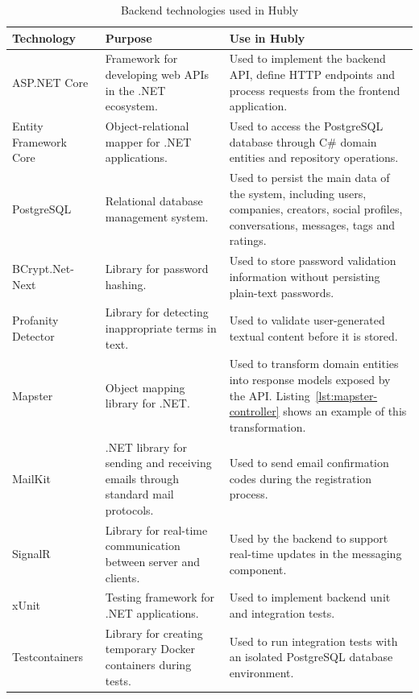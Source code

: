 \begin{table}[H]
\centering
\small
\begin{tabular}{|p{}|p{}|p{}|}
\hline
\textbf{Technology} & \textbf{Purpose} & \textbf{Use in Hubly} \\ \hline
ASP.NET Core~\cite{aspnetcore} & Framework for developing web APIs in the .NET ecosystem. & Used to implement the backend API, define HTTP endpoints and process requests from the frontend application. \\ \hline
Entity Framework Core~\cite{entityframeworkcore} & Object-relational mapper for .NET applications. & Used to access the PostgreSQL database through C\# domain entities and repository operations. \\ \hline
PostgreSQL~\cite{postgreSql} & Relational database management system. & Used to persist the main data of the system, including users, companies, creators, social profiles, conversations, messages, tags and ratings. \\ \hline
BCrypt.Net-Next~\cite{bcrypt} & Library for password hashing. & Used to store password validation information without persisting plain-text passwords. \\ \hline
Profanity Detector~\cite{profanitydetector} & Library for detecting inappropriate terms in text. & Used to validate user-generated textual content before it is stored. \\ \hline
Mapster~\cite{mapster} & Object mapping library for .NET. & Used to transform domain entities into response models exposed by the API. Listing~\ref{lst:mapster-controller} shows an example of this transformation. \\ \hline
MailKit~\cite{mailkit} & .NET library for sending and receiving emails through standard mail protocols. & Used to send email confirmation codes during the registration process. \\ \hline
SignalR~\cite{signalr} & Library for real-time communication between server and clients. & Used by the backend to support real-time updates in the messaging component. \\ \hline
xUnit~\cite{xunit} & Testing framework for .NET applications. & Used to implement backend unit and integration tests. \\ \hline
Testcontainers~\cite{testcontainers} & Library for creating temporary Docker containers during tests. & Used to run integration tests with an isolated PostgreSQL database environment. \\ \hline
\end{tabular}
\caption{Backend technologies used in Hubly}
\label{tab:backend_technologies}
\end{table}


